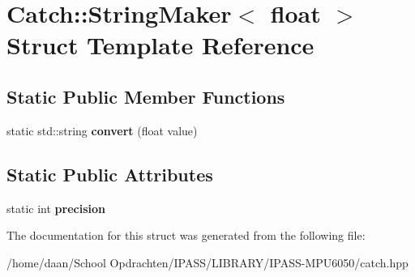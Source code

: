 \hypertarget{structCatch_1_1StringMaker_3_01float_01_4}{}\section{Catch\+:\+:String\+Maker$<$ float $>$ Struct Template Reference}
\label{structCatch_1_1StringMaker_3_01float_01_4}
\subsection*{Static Public Member Functions}
\begin{DoxyCompactItemize}
\item 
\mbox{\label{structCatch_1_1StringMaker_3_01float_01_4_a7ffacc6fa46a338200f3fbb2ee078648}} 
static std\+::string {\bfseries convert} (float value)
\end{DoxyCompactItemize}
\subsection*{Static Public Attributes}
\begin{DoxyCompactItemize}
\item 
\mbox{\label{structCatch_1_1StringMaker_3_01float_01_4_a54ebebe76a755dbe2dd8ad409c329378}} 
static int {\bfseries precision}
\end{DoxyCompactItemize}


The documentation for this struct was generated from the following file\+:\begin{DoxyCompactItemize}
\item 
/home/daan/\+School Opdrachten/\+I\+P\+A\+S\+S/\+L\+I\+B\+R\+A\+R\+Y/\+I\+P\+A\+S\+S-\/\+M\+P\+U6050/catch.\+hpp\end{DoxyCompactItemize}
